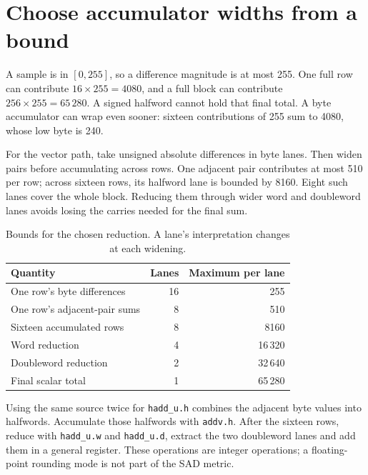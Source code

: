 \section{Choose accumulator widths from a bound}
A sample is in $[0,255]$, so a difference magnitude is at most 255. One full row
can contribute $16\times255=4080$, and a full block can contribute
$256\times255=65\,280$. A signed halfword cannot hold that final total. A byte
accumulator can wrap even sooner: sixteen contributions of 255 sum to 4080,
whose low byte is 240.

For the vector path, take unsigned absolute differences in byte lanes. Then widen
pairs before accumulating across rows. One adjacent pair contributes at most 510
per row; across sixteen rows, its halfword lane is bounded by 8160. Eight such
lanes cover the whole block. Reducing them through wider word and doubleword
lanes avoids losing the carries needed for the final sum.

\begin{table}[htbp]
  \centering
  \caption{Bounds for the chosen reduction. A lane's interpretation changes at each widening.}
  \begin{tabular}{lrr}
    \toprule
    Quantity                     & Lanes & Maximum per lane \\
    \midrule
    One row's byte differences   & 16    & 255              \\
    One row's adjacent-pair sums & 8     & 510              \\
    Sixteen accumulated rows     & 8     & 8160             \\
    Word reduction               & 4     & 16\,320          \\
    Doubleword reduction         & 2     & 32\,640          \\
    Final scalar total           & 1     & 65\,280          \\
    \bottomrule
  \end{tabular}
\end{table}

Using the same source twice for \texttt{hadd\_u.h} combines the adjacent byte
values into halfwords. Accumulate those halfwords with \texttt{addv.h}. After the
sixteen rows, reduce with \texttt{hadd\_u.w} and \texttt{hadd\_u.d}, extract the
two doubleword lanes and add them in a general register. These operations are
integer operations; a floating-point rounding mode is not part of the SAD metric.

